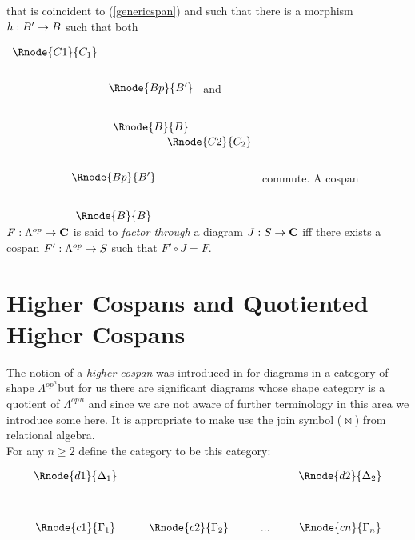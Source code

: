 \documentclass[10pt,a4paper]{article}
\begin{document}
\noindent
that is coincident to (\ref{genericspan}) and such that there is a morphism 
$h: B' \rightarrow B$ such that both \\
\vspace {0.25cm}

$
\begin{array}{cc}
\Rnode{C1}{C_1}                             \\ [0.7cm]
               & \Rnode{Bp}{B'}             \\ [0.8cm]
							 &  \Rnode{B}{B} 
\end{array}
$
and
$
\begin{array}{p{1.5cm}cc}
&                &\Rnode{C2}{C_2}     \\ [0.7cm]
&\Rnode{Bp}{B'}                       \\ [0.8cm]
&\Rnode{B}{B}
\end{array}
$
commute. 
\noindent
A cospan $F:\Lambda^{op} \rightarrow \textbf{C}$ is said to \textit{factor through}  a diagram 
$J:S \rightarrow \textbf{C}$ iff there exists a cospan $F': \Lambda^{op} \rightarrow S$ 
such that $F' \circ J = F$.
  
\section{Higher Cospans and Quotiented Higher Cospans}
The notion of a \textit{higher cospan} was
 introduced in \cite{Grandis2007} for diagrams
in a category of shape $\Lambda^{op^n}$but for us there are significant diagrams whose 
shape category is a quotient of  ${\Lambda^{op}}^n$ and since we are not aware
of further terminology in this area we introduce some here. It is appropriate to make use the join symbol ($\Join$) from relational algebra. \\

\noindent For any $n \geq 2$ define the category \ndidly to be this category:

\begin{center}
\begin{displaymath}
\begin{array}{cp{0.3cm}c         p{0.3cm}  c p{0.2cm} c}
\Rnode{d1}{\Delta_1}& &               & &     & &\Rnode{d2}{\Delta_2}  \\ [1.2cm]
\Rnode{c1}{\Gamma_1}& &\Rnode{c2}{\Gamma_2}& & ... & &\Rnode{cn}{\Gamma_n}
\end{array}
\end{displaymath}
\end{center}
\end{document}
